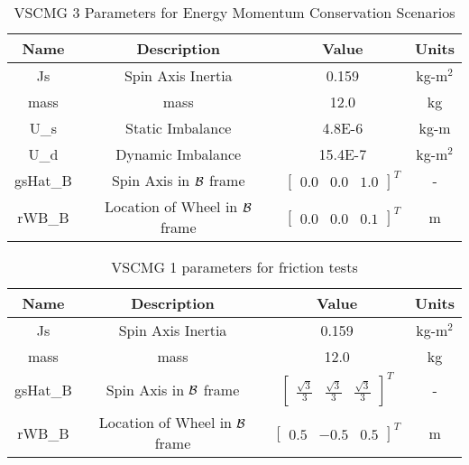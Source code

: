 \begin{table}[htbp]
	\caption{VSCMG 3 Parameters for Energy Momentum Conservation Scenarios}
	\label{tab:rw3}
	\centering \fontsize{10}{10}\selectfont
	\begin{tabular}{ c | c | c | c } %
		\hline
		\textbf{Name}  & \textbf{Description}  & \textbf{Value} & \textbf{Units} \\
		\hline
		Js  & Spin Axis Inertia & 0.159 & kg-m$^2$ \\
		mass & mass & 12.0 & kg \\
		U\_s & Static Imbalance & 4.8E-6 & kg-m \\
		U\_d & Dynamic Imbalance & 15.4E-7 & kg-m$^2$ \\
		gsHat\_B & Spin Axis in $\cal{B}$ frame & $\begin{bmatrix}
		0.0 & 0.0 & 1.0 \end{bmatrix}^T$ & - \\
		rWB\_B & Location of Wheel in $\cal{B}$ frame & $\begin{bmatrix}
		0.0 & 0.0 & 0.1 \end{bmatrix}^T$ & m \\
		\hline
	\end{tabular}
\end{table}

\begin{table}[htbp]
	\caption{VSCMG 1 parameters for friction tests}
	\label{tab:rwFriction}
	\centering \fontsize{10}{10}\selectfont
	\begin{tabular}{ c | c | c | c } %
		\hline
		\textbf{Name}  & \textbf{Description}  & \textbf{Value} & \textbf{Units} \\
		\hline
		Js  & Spin Axis Inertia & 0.159 & kg-m$^2$ \\
		mass & mass & 12.0 & kg \\
		gsHat\_B & Spin Axis in $\cal{B}$ frame & $\begin{bmatrix}
		\frac{\sqrt{3}}{3} & \frac{\sqrt{3}}{3} & \frac{\sqrt{3}}{3} \end{bmatrix}^T$ & - \\
		rWB\_B & Location of Wheel in $\cal{B}$ frame & $\begin{bmatrix}
		0.5 & -0.5 & 0.5 \end{bmatrix}^T$ & m \\
		\hline
	\end{tabular}
\end{table}

